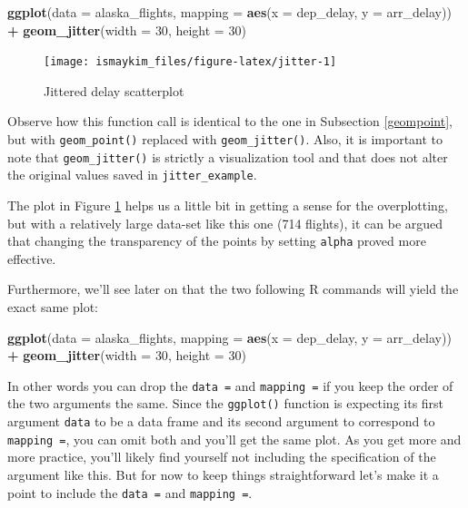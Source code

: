 \documentclass[12pt,]{krantz}
\makeatletter
\newenvironment{Shaded}{\begin{snugshade}}{\end{snugshade}}
\newcommand{\KeywordTok}[1]{\textcolor[rgb]{0.27,0.27,0.27}{\textbf{#1}}}
\newcommand{\DataTypeTok}[1]{\textcolor[rgb]{0.27,0.27,0.27}{#1}}
\newcommand{\DecValTok}[1]{\textcolor[rgb]{0.06,0.06,0.06}{#1}}
\newcommand{\StringTok}[1]{\textcolor[rgb]{0.5,0.5,0.5}{#1}}
\newcommand{\OperatorTok}[1]{\textcolor[rgb]{0.43,0.43,0.43}{\textbf{#1}}}
\newcommand{\NormalTok}[1]{#1}
\newenvironment{kframe}{%
\medskip{}
\setlength{\fboxsep}{.8em}
 \def\at@end@of@kframe{}%
 \ifinner\ifhmode%
  \def\at@end@of@kframe{\end{minipage}}%
  \begin{minipage}{\columnwidth}%
 \fi\fi%
 \def\FrameCommand##1{\hskip\@totalleftmargin \hskip-\fboxsep
 \colorbox{shadecolor}{##1}\hskip-\fboxsep
     \hskip-\linewidth \hskip-\@totalleftmargin \hskip\columnwidth}%
 \MakeFramed {\advance\hsize-\width
   \@totalleftmargin\z@ \linewidth\hsize
   \@setminipage}}%
 {\par\unskip\endMakeFramed%
 \at@end@of@kframe}
\renewenvironment{Shaded}{\begin{kframe}}{\end{kframe}}
\makeatother
\begin{document}
\begin{Shaded}
\begin{Highlighting}[]
\KeywordTok{ggplot}\NormalTok{(}\DataTypeTok{data =}\NormalTok{ alaska_flights, }
       \DataTypeTok{mapping =} \KeywordTok{aes}\NormalTok{(}\DataTypeTok{x =}\NormalTok{ dep_delay, }\DataTypeTok{y =}\NormalTok{ arr_delay)) }\OperatorTok{+}\StringTok{ }
\StringTok{  }\KeywordTok{geom_jitter}\NormalTok{(}\DataTypeTok{width =} \DecValTok{30}\NormalTok{, }\DataTypeTok{height =} \DecValTok{30}\NormalTok{)}
\end{Highlighting}
\end{Shaded}

\begin{figure}

{\centering \texttt{[image: ismaykim\_files/figure-latex/jitter-1]} 

}

\caption{Jittered delay scatterplot}\label{fig:jitter}
\end{figure}

Observe how this function call is identical to the one in Subsection
\ref{geompoint}, but with \texttt{geom\_point()} replaced with
\texttt{geom\_jitter()}. Also, it is important to note that
\texttt{geom\_jitter()} is strictly a visualization tool and that does
not alter the original values saved in \texttt{jitter\_example}.

The plot in Figure \ref{fig:jitter} helps us a little bit in getting a
sense for the overplotting, but with a relatively large data-set like
this one (714 flights), it can be argued that changing the transparency
of the points by setting \texttt{alpha} proved more effective.

Furthermore, we'll see later on that the two following R commands will
yield the exact same plot:

\begin{Shaded}
\begin{Highlighting}[]
\KeywordTok{ggplot}\NormalTok{(}\DataTypeTok{data =}\NormalTok{ alaska_flights, }
       \DataTypeTok{mapping =} \KeywordTok{aes}\NormalTok{(}\DataTypeTok{x =}\NormalTok{ dep_delay, }\DataTypeTok{y =}\NormalTok{ arr_delay)) }\OperatorTok{+}\StringTok{ }
\StringTok{  }\KeywordTok{geom_jitter}\NormalTok{(}\DataTypeTok{width =} \DecValTok{30}\NormalTok{, }\DataTypeTok{height =} \DecValTok{30}\NormalTok{)}
\end{Highlighting}
\end{Shaded}

In other words you can drop the \texttt{data\ =} and \texttt{mapping\ =}
if you keep the order of the two arguments the same. Since the
\texttt{ggplot()} function is expecting its first argument \texttt{data}
to be a data frame and its second argument to correspond to
\texttt{mapping\ =}, you can omit both and you'll get the same plot. As
you get more and more practice, you'll likely find yourself not
including the specification of the argument like this. But for now to
keep things straightforward let's make it a point to include the
\texttt{data\ =} and \texttt{mapping\ =}.
\end{document}
